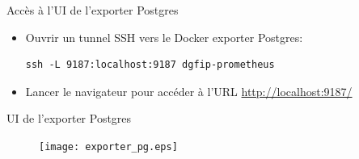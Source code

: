 \begin{frame}[fragile]{Accès à l'UI de l'exporter Postgres}

\begin{itemize}
\item Ouvrir un tunnel SSH vers le Docker exporter Postgres:
\begin{tiny}
\begin{Verbatim}[commandchars=\\\{\}]
ssh -L 9187:localhost:9187 dgfip-prometheus
\end{Verbatim}
\end{tiny}
\item Lancer le navigateur pour accéder à l'URL \url{http://localhost:9187/}
\end{itemize}

\end{frame}


\begin{frame}[fragile]{UI de l'exporter Postgres}

\begin{figure}
\begin{center}
\texttt{[image: exporter\_pg.eps]}
\end{center}
\end{figure}

\end{frame}


